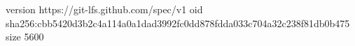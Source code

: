version https://git-lfs.github.com/spec/v1
oid sha256:cbb5420d3b2c4a114a0a1dad3992fc0dd878fdda033c704a32c238f81db0b475
size 5600
